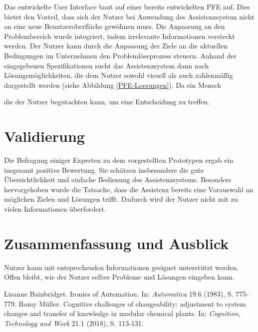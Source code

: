 \documentclass{ifaPoster}
\begin{document}
Das entwickelte User Interface baut auf einer bereits entwickelten PFE auf. Dies bietet den Vorteil, dass sich der Nutzer bei Anwendung des Assistenzsystem nicht an eine neue Benutzeroberfläche gewöhnen muss. Die Anpassung an den Problembereich wurde integriert, indem irrelevante Informationen versteckt werden. Der Nutzer kann durch die Anpassung der Ziele an die aktuellen Bedingungen im Unternehmen den Problemlöseprozess steuern. Anhand der eingegebenen Spezifikationen sucht das Assistenzsystem dann nach Lösungsmöglichkeiten, die dem Nutzer sowohl visuell als auch zahlenmäßig dargestellt werden (siehe Abbildung \ref{PFE-Loesungen}). Da ein Mensch 

 die der Nutzer begutachten kann, um eine Entscheidung zu treffen.


\section{Validierung}
Die Befragung einiger Experten zu dem vorgestellten Prototypen ergab ein insgesamt positive Bewertung. Sie schätzen insbesondere die gute Übersichtlichkeit und einfache Bedienung des Assistenzsystems. Besonders hervorgehoben wurde die Tatsache, dass die Assistenz bereits eine Vorauswahl an möglichen Zielen und Lösungen trifft. Dadurch wird der Nutzer nicht mit zu vielen Informationen überfordert. 


\section{Zusammenfassung und Ausblick}
Nutzer kann mit entsprechenden Informationen geeignet unterstützt werden. Offen bleibt, wie der Nutzer selber Probleme und Lösungen eingeben kann.


 {\tiny\renewcommand{\section}[2]{}%
 	 \begin{thebibliography}{8.5}
 	 	Lisanne Bainbridget. {\glqq Ironies of Automation\grqq}. {In: \textit{Automatica}} 19.6 (1983), S. 775-779.
 	 Romy Müller. {\glqq Cognitive challenges of changeability: adjustment
to system changes and transfer of knowledge in modular
chemical plants\grqq}. {In: \textit{Cognition, Technology and Work}} 21.1 (2018), S. 113-131.
	\end{thebibliography}}
	
\end{document}
